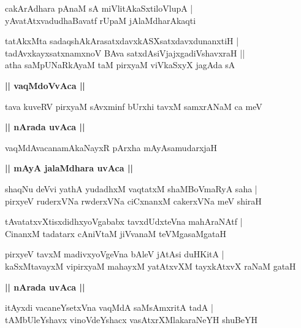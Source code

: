 \documentclass[twoside,12pt,openright]{book}
\newcounter{shloka}[chapter]
\def\uvaca#1{\centerline{{\large\textbf{#1}}}}
\begin{document}
\begin{shloka}%
cakArAdhara pAnaM sA miVlitAkaSxtiloVlupA |\\
yAvatAtxvadudhaBavatf rUpaM jAlaMdharAkaqti 
\end{shloka}

\begin{shloka}%
tatAkxMta sadaqshAkArasatxdavxkASXsatxdavxdunanxtiH |\\
tadAvxkayxsatxnamxnoV BAva satxdAsiVjajxgadiVshavxraH ||\\
atha saMpUNaRkAyaM taM pirxyaM viVkaSxyX jagAda sA 
\end{shloka}

\uvaca{|| vaqMdoVvAca ||}

\begin{shloka}%
tava kuveRV pirxyaM sAvxminf bUrxhi tavxM samxrANaM ca meV 
\end{shloka}

\uvaca{|| nArada uvAca ||}

\begin{shloka}%
vaqMdAvacanamAkaNayxR pArxha mAyAsamudarxjaH 
\end{shloka}

\uvaca{|| mAyA jalaMdhara uvAca ||}

\begin{shloka}%
shaqNu deVvi yathA yudadhxM vaqtatxM shaMBoVmaRyA saha |\\
pirxyeV ruderxVNa rwderxVNa ciCxnanxM cakerxVNa meV shiraH 
\end{shloka}

\begin{shloka}%
tAvatatxvXtisxdidhxyoVgababx tavxdUdxteVna mahAraNAtf |\\
CinanxM tadatarx cAniVtaM jiVvanaM teVMgasaMgataH 
\end{shloka}

\begin{shloka}%
pirxyeV tavxM madivxyoVgeVna bAleV jAtAsi duHKitA |\\
kaSxMtavayxM vipirxyaM mahayxM yatAtxvXM tayxkAtxvX  raNaM gataH 
\end{shloka}

\uvaca{|| nArada uvAca ||}

\begin{shloka}%
itAyxdi vacaneYsetxVna vaqMdA saMsAmxritA tadA |\\
tAMbUleYshavx vinoVdeYshacx vasAtxrXMlakaraNeYH shuBeYH 
\end{shloka}
\end{document}

